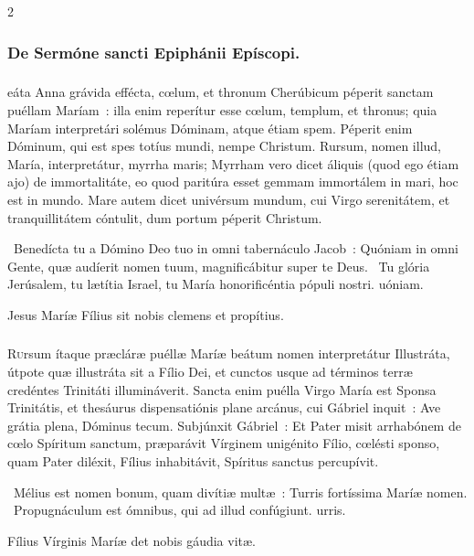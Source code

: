 \documentclass[9pt,twoside]{extarticle}
\begin{document}
\begin{multicols}{2}
{{\subsubsection*{\center De Sermóne sancti Epiphánii Epíscopi.}
\subsubsection*{\center {}}
eáta Anna grávida effécta, cœlum, et thronum Cherúbicum péperit sanctam puéllam Maríam~: illa enim reperítur esse cœlum, templum, et thronus; quia Maríam interpretári solémus Dóminam, atque étiam spem. Péperit enim Dóminum, qui est spes totíus mundi, nempe Christum. Rursum, nomen illud, María, interpretátur, myrrha maris; Myrrham vero dicet áliquis (quod ego étiam ajo) de immortalitáte, eo quod paritúra esset gemmam immortálem in mari, hoc est in mundo. Mare autem dicet univérsum mundum, cui Virgo serenitátem, et tranquillitátem cóntulit, dum portum péperit Christum.

\begin{tightlist}{}
\item {}~Benedícta tu a Dómino Deo tuo in omni tabernáculo Jacob~: \textred{*} Quóniam in omni Gente, quæ audíerit nomen tuum, magnificábitur super te Deus. ~Tu glória Jerúsalem, tu lætítia Israel, tu María honorificéntia pópuli nostri. uóniam.
\item {\small {} Jesus Maríæ Fílius sit nobis clemens et propítius.}
\end{tightlist}

\subsubsection*{\center {}}
\lettrine{R}ursum ítaque præcláræ puéllæ Maríæ beátum nomen interpretátur Illustráta, útpote quæ illustráta sit a Fílio Dei, et cunctos usque ad términos terræ credéntes Trinitáti illumináverit. Sancta enim puélla Virgo María est Sponsa Trinitátis, et thesáurus dispensatiónis plane arcánus, cui Gábriel inquit~: Ave grátia plena, Dóminus tecum. Subjúnxit Gábriel~: Et Pater misit arrhabónem de cœlo Spíritum sanctum, præparávit Vírginem unigénito Fílio, cœlésti sponso, quam Pater diléxit, Fílius inhabitávit, Spíritus sanctus percupívit.

\begin{tightlist}{}
\item {}~Mélius est nomen bonum, quam divítiæ multæ~: \textred{*} Turris fortíssima Maríæ nomen. ~Propugnáculum est ómnibus, qui ad illud confúgiunt. urris.
\item {\small {} Fílius Vírginis Maríæ det nobis gáudia vitæ.}
\end{tightlist}

}}
\end{multicols}
\end{document}
